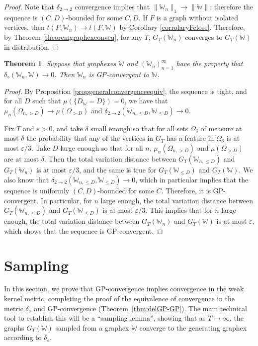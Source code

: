 \documentclass{amsart}
\numberwithin{equation}{section}
\numberwithin{figure}{section}
\newtheorem{theorem}{Theorem}[section]
\theoremstyle{definition}
\theoremstyle{remark}
\newcommand{\cW}{\mathbb{W}}
\newcommand{\deltt}{\delta_{2\to 2}}
\def\delGP{\delta_\diamond}
\begin{document}
\begin{proof}
Note that $\deltt$ convergence implies that $\|\cW_n\|_1 \rightarrow
\|\cW\|$; therefore the sequence is $(C,D)$-bounded for some $C,D$. If $F$ is
a graph without isolated vertices, then $t(F,\cW_n) \rightarrow t(F,\cW)$ by
Corollary \ref{corrolaryFclose}. Therefore, by Theorem
\ref{theoremgraphexconveq}, for any $T$, $G_T(\cW_n)$ converges to $G_T(\cW)$
in distribution.
\end{proof}

\begin{theorem} \label{theoremdimpliessampling}
Suppose that graphexes $\cW$ and $(\cW_n)_{n=1}^\infty$ have the property
that $\delGP(\cW_n,\cW) \rightarrow 0$. Then $\cW_n$ is GP-convergent to
$\cW$.
\end{theorem}

\begin{proof}
By Proposition \ref{propgeneralconvergenceequiv}, the sequence is tight, and
for all $D$ such that $\mu(\{D_\cW=D\})=0$, we have that
$\mu_n(\Omega_{n,>D}) \rightarrow \mu(\Omega_{>D})$ and $\deltt(\cW_{n,\leq
D},\cW_{\leq D}) \rightarrow 0$.

Fix $T$ and $\varepsilon>0$, and take $\delta$ small enough so that for all
sets $\Omega_\delta$ of measure at most $\delta$ the probability that any of
the vertices in $G_T$ has a feature in $\Omega_\delta$ is at most
$\varepsilon/3$. Take $D$ large enough so that for all $n$,
$\mu_n(\Omega_{n,>D})$ and $ \mu(\Omega_{>D})$ are at most $\delta$. Then the
total variation distance between $G_T(\cW_{n,\leq D})$ and $G_T(\cW_n)$ is at
most $\varepsilon/3$, and the same is true for $G_T(\cW_{\leq D})$ and
$G_T(\cW)$. We also know that $\deltt(\cW_{n,\leq D},\cW_{\leq D})
\rightarrow 0$, which in particular implies that the sequence is uniformly
$(C,D)$-bounded for some $C$. Therefore, it is GP-convergent. In particular,
for $n$ large enough, the total variation distance between $G_T(\cW_{n,\leq
D})$ and $G_T(\cW_{\leq D})$ is at most $\varepsilon/3$. This implies that
for $n$ large enough, the total variation distance between $G_T(\cW_n)$ and
$G_T(\cW)$ is at most $\varepsilon$, which shows that the sequence is
GP-convergent.
\end{proof}

\section{Sampling} \label{sec:sampling}

In this section, we prove that GP-convergence implies convergence in the weak
kernel metric, completing the proof of the equivalence of convergence in the
metric $\delGP$ and GP-convergence (Theorem~\ref{thm:delGP-GP}). The main
technical tool to establish this will be a ``sampling lemma'', showing that
as $T\to\infty$, the graphs $G_T(\cW)$ sampled from a graphex $\cW$ converge
to the generating graphex according to $\delGP$.
\end{document}
